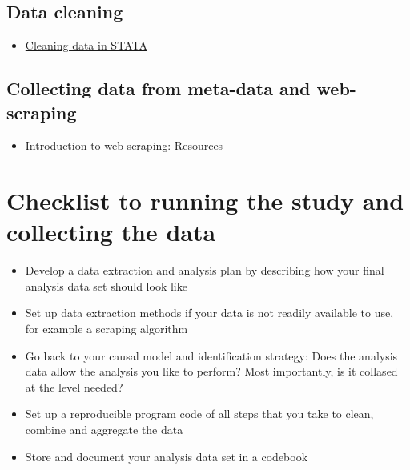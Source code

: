 \documentclass[
]{book}
\providecommand{\tightlist}{%
  \setlength{\itemsep}{0pt}\setlength{\parskip}{0pt}}
\begin{document}
\hypertarget{data-cleaning}{%
\subsection{Data cleaning}\label{data-cleaning}}

\begin{itemize}
\tightlist
\item
  \href{https://mdl.library.utoronto.ca/technology/tutorials/cleaning-data-stata}{Cleaning
  data in STATA}
\end{itemize}

\hypertarget{collecting-data-from-meta-data-and-web-scraping}{%
\subsection{Collecting data from meta-data and
web-scraping}\label{collecting-data-from-meta-data-and-web-scraping}}

\begin{itemize}
\tightlist
\item
  \href{https://librarycarpentry.org/lc-webscraping/reference}{Introduction
  to web scraping: Resources}
\end{itemize}

\hypertarget{checklist-to-running-the-study-and-collecting-the-data}{%
\section{Checklist to running the study and collecting the
data}\label{checklist-to-running-the-study-and-collecting-the-data}}

\begin{itemize}
\tightlist
\item
  Develop a data extraction and analysis plan by describing how your
  final analysis data set should look like
\item
  Set up data extraction methods if your data is not readily available
  to use, for example a scraping algorithm
\item
  Go back to your causal model and identification strategy: Does the
  analysis data allow the analysis you like to perform? Most
  importantly, is it collased at the level needed?
\item
  Set up a reproducible program code of all steps that you take to
  clean, combine and aggregate the data
\item
  Store and document your analysis data set in a codebook
\end{itemize}
\end{document}
